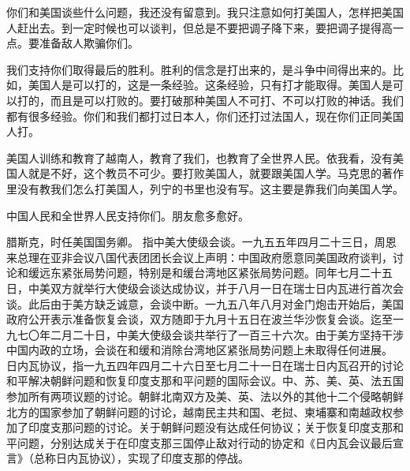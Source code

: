 你们和美国谈些什么问题，我还没有留意到。我只注意如何打美国人，怎样把美国人赶出去。到一定时候也可以谈判，但总是不要把调子降下来，要把调子提得高一点。要准备敌人欺骗你们。

我们支持你们取得最后的胜利。胜利的信念是打出来的，是斗争中间得出来的。比如，美国人是可以打的，这是一条经验。这条经验，只有打才能取得。美国人是可以打的，而且是可以打败的。要打破那种美国人不可打、不可以打败的神话。我们都有很多经验。你们和我们都打过日本人，你们还打过法国人，现在你们正同美国人打。

美国人训练和教育了越南人，教育了我们，也教育了全世界人民。依我看，没有美国人就是不好，这个教员不可少。要打败美国人，就要跟美国人学。马克思的著作里没有教我们怎么打美国人，列宁的书里也没有写。这主要是靠我们向美国人学。

中国人民和全世界人民支持你们。朋友愈多愈好。

\begin{maonote}
腊斯克，时任美国国务卿。
指中美大使级会谈。一九五五年四月二十三日，周恩来总理在亚非会议八国代表团团长会议上声明：中国政府愿意同美国政府谈判，讨论和缓远东紧张局势问题，特别是和缓台湾地区紧张局势问题。同年七月二十五日，中美双方就举行大使级会谈达成协议，并于八月一日在瑞士日内瓦进行首次会谈。此后由于美方缺乏诚意，会谈中断。一九五八年八月对金门炮击开始后，美国政府公开表示准备恢复会谈，双方随即于九月十五日在波兰华沙恢复会谈。迄至一九七〇年二月二十日，中美大使级会谈共举行了一百三十六次。由于美方坚持干涉中国内政的立场，会谈在和缓和消除台湾地区紧张局势问题上未取得任何进展。
日内瓦协议，指一九五四年四月二十六日至七月二十一日在瑞士日内瓦召开的讨论和平解决朝鲜问题和恢复印度支那和平问题的国际会议。中、苏、美、英、法五国参加所有两项议题的讨论。朝鲜北南双方及美、英、法以外的其他十二个侵略朝鲜北方的国家参加了朝鲜问题的讨论，越南民主共和国、老挝、柬埔寨和南越政权参加了印度支那问题的讨论。关于朝鲜问题没有达成任何协议；关于恢复印度支那和平问题，分别达成关于在印度支那三国停止敌对行动的协定和《日内瓦会议最后宣言》（总称日内瓦协议），实现了印度支那的停战。
\end{maonote}
